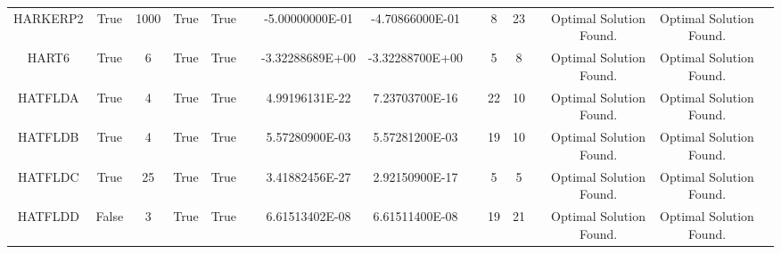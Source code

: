 \begin{longtable}{ccccccccccccccc}
	\cellcolor{default2} HARKERP2& \cellcolor{default2} True& \cellcolor{default2} 1000& \cellcolor{default2} True& \cellcolor{default2} True& \cellcolor{header} & \cellcolor{best} -5.00000000E-01& \cellcolor{poor} -4.70866000E-01& \cellcolor{header} & \cellcolor{best} 8& \cellcolor{poor} 23& \cellcolor{header} & \cellcolor{default2} Optimal Solution Found.& \cellcolor{default2} Optimal Solution Found.& \cellcolor{header} \\
	\cellcolor{default1} HART6& \cellcolor{default1} True& \cellcolor{default1} 6& \cellcolor{default1} True& \cellcolor{default1} True& \cellcolor{header} & \cellcolor{ok} -3.32288689E+00& \cellcolor{best} -3.32288700E+00& \cellcolor{header} & \cellcolor{best} 5& \cellcolor{ok} 8& \cellcolor{header} & \cellcolor{default1} Optimal Solution Found.& \cellcolor{default1} Optimal Solution Found.& \cellcolor{header} \\
	\cellcolor{default2} HATFLDA& \cellcolor{default2} True& \cellcolor{default2} 4& \cellcolor{default2} True& \cellcolor{default2} True& \cellcolor{header} & \cellcolor{best} 4.99196131E-22& \cellcolor{ok} 7.23703700E-16& \cellcolor{header} & \cellcolor{poor} 22& \cellcolor{best} 10& \cellcolor{header} & \cellcolor{default2} Optimal Solution Found.& \cellcolor{default2} Optimal Solution Found.& \cellcolor{header} \\
	\cellcolor{default1} HATFLDB& \cellcolor{default1} True& \cellcolor{default1} 4& \cellcolor{default1} True& \cellcolor{default1} True& \cellcolor{header} & \cellcolor{best} 5.57280900E-03& \cellcolor{ok} 5.57281200E-03& \cellcolor{header} & \cellcolor{ok} 19& \cellcolor{best} 10& \cellcolor{header} & \cellcolor{default1} Optimal Solution Found.& \cellcolor{default1} Optimal Solution Found.& \cellcolor{header} \\
	\cellcolor{default2} HATFLDC& \cellcolor{default2} True& \cellcolor{default2} 25& \cellcolor{default2} True& \cellcolor{default2} True& \cellcolor{header} & \cellcolor{best} 3.41882456E-27& \cellcolor{ok} 2.92150900E-17& \cellcolor{header} & \cellcolor{best} 5& \cellcolor{best} 5& \cellcolor{header} & \cellcolor{default2} Optimal Solution Found.& \cellcolor{default2} Optimal Solution Found.& \cellcolor{header} \\
	\cellcolor{default1} HATFLDD& \cellcolor{default1} False& \cellcolor{default1} 3& \cellcolor{default1} True& \cellcolor{default1} True& \cellcolor{header} & \cellcolor{ok} 6.61513402E-08& \cellcolor{best} 6.61511400E-08& \cellcolor{header} & \cellcolor{best} 19& \cellcolor{ok} 21& \cellcolor{header} & \cellcolor{default1} Optimal Solution Found.& \cellcolor{default1} Optimal Solution Found.& \cellcolor{header} \\

\end{longtable}

